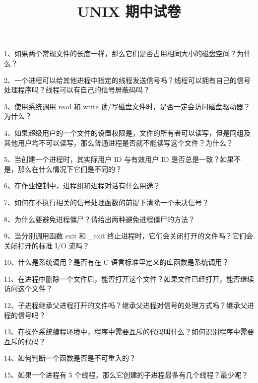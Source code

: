 \documentclass[fontset=exam]{exam-zh}
\title{UNIX 期中试卷}
\begin{document}
\maketitle
{}

\par{}\smallskip

1、如果两个常规文件的长度一样，那么它们是否占用相同大小的磁盘空间？为什么？

2、一个进程可以给其他进程中指定的线程发送信号吗？线程可以拥有自己的信号处理程序吗？线程可以有自己的信号屏蔽码吗？

3、使用系统调用 read 和 write 读/写磁盘文件时，是否一定会访问磁盘驱动器？为什么？

4、如果超级用户的一个文件的设置权限是，文件的所有者可以读写，但是同组及其他用户均不可以读写，那么普通进程是否就不能读写这个文件？为什么？

5、当创建一个进程时，其实际用户 ID 与有效用户 ID 是否总是一致？如果不是，那么在什么情况下它们是不同的？

6、在作业控制中，进程组和进程对话有什么用途？

7、如何在不执行相关的信号处理函数的前提下清除一个未决信号？

8、为什么要避免进程僵尸？请给出两种避免进程僵尸的方法？

9、当分别调用函数 exit 和 \_exit 终止进程时，它们会关闭打开的文件吗？它们会关闭打开的标准 I/O 流吗？

10、什么是系统调用？是否有在 C 语言标准里定义的库函数是系统调用？

11、在进程中删除一个文件后，能否打开这个文件？如果文件已经打开，能否继续访问这个文件？

12、子进程继承父进程打开的文件吗？继承父进程对信号的处理方式吗？继承父进程的信号吗？

13、在操作系统编程环境中，程序中需要互斥的代码叫什么？如何识别程序中需要互斥的代码？

14、如何判断一个函数是否是不可重入的？

15、如果一个进程有 5 个线程，那么它创建的子进程最多有几个线程？最少呢？


\par{}\smallskip
\end{document}
